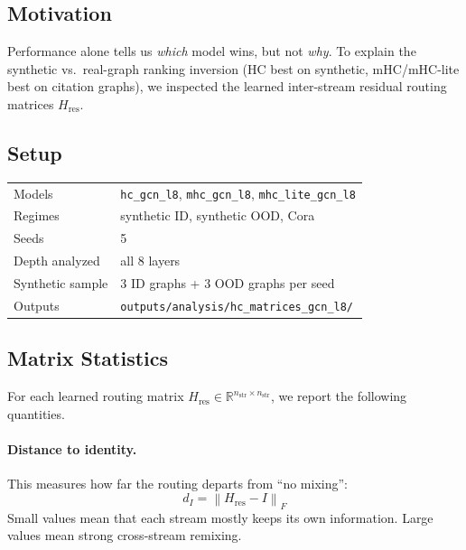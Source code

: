 \documentclass[11pt,a4paper]{article}
\begin{document}
\subsection{Motivation}

Performance alone tells us \emph{which} model wins, but not \emph{why}.
To explain the synthetic vs.\ real-graph ranking inversion
(HC best on synthetic, mHC/mHC-lite best on citation graphs),
we inspected the learned inter-stream residual routing matrices
$H_{\mathrm{res}}$.

\subsection{Setup}

\begin{table}[h]
\centering
\begin{tabular}{L{4.2cm} L{7.2cm}}
\toprule
Models & \texttt{hc\_gcn\_l8}, \texttt{mhc\_gcn\_l8}, \texttt{mhc\_lite\_gcn\_l8} \\
Regimes & synthetic ID, synthetic OOD, Cora \\
Seeds & 5 \\
Depth analyzed & all 8 layers \\
Synthetic sample & 3 ID graphs + 3 OOD graphs per seed \\
Outputs & \texttt{outputs/analysis/hc\_matrices\_gcn\_l8/} \\
\bottomrule
\end{tabular}
\end{table}

\subsection{Matrix Statistics}

For each learned routing matrix $H_{\mathrm{res}} \in \mathbb{R}^{n_{\mathrm{str}}\times n_{\mathrm{str}}}$,
we report the following quantities.

\paragraph{Distance to identity.}
This measures how far the routing departs from ``no mixing'':
\[
d_I = \left\| H_{\mathrm{res}} - I \right\|_F
\]
Small values mean that each stream mostly keeps its own information.
Large values mean strong cross-stream remixing.
\end{document}
